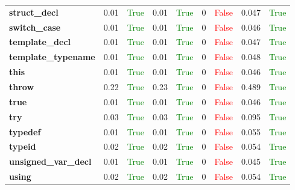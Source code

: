 \documentclass{article}
\begin{document}
\begin{xltabular}{\textwidth}{lcccccccc}
\textbf{{\fontsize{10}{12}\selectfont struct\_decl}}& 0.01&\textcolor{green}{True}& 0.01&\textcolor{green}{True}& 0&\textcolor{red}{False}& 0.047&\textcolor{green}{True} \\[0.5ex]
\textbf{{\fontsize{10}{12}\selectfont switch\_case}}& 0.01&\textcolor{green}{True}& 0.01&\textcolor{green}{True}& 0&\textcolor{red}{False}& 0.046&\textcolor{green}{True} \\[0.5ex]
\textbf{{\fontsize{10}{12}\selectfont template\_decl}}& 0.01&\textcolor{green}{True}& 0.01&\textcolor{green}{True}& 0&\textcolor{red}{False}& 0.047&\textcolor{green}{True} \\[0.5ex]
\textbf{{\fontsize{10}{12}\selectfont template\_typename}}& 0.01&\textcolor{green}{True}& 0.01&\textcolor{green}{True}& 0&\textcolor{red}{False}& 0.048&\textcolor{green}{True} \\[0.5ex]
\textbf{{\fontsize{10}{12}\selectfont this}}& 0.01&\textcolor{green}{True}& 0.01&\textcolor{green}{True}& 0&\textcolor{red}{False}& 0.046&\textcolor{green}{True} \\[0.5ex]
\textbf{{\fontsize{10}{12}\selectfont throw}}& 0.22&\textcolor{green}{True}& 0.23&\textcolor{green}{True}& 0&\textcolor{red}{False}& 0.489&\textcolor{green}{True} \\[0.5ex]
\textbf{{\fontsize{10}{12}\selectfont true}}& 0.01&\textcolor{green}{True}& 0.01&\textcolor{green}{True}& 0&\textcolor{red}{False}& 0.046&\textcolor{green}{True} \\[0.5ex]
\textbf{{\fontsize{10}{12}\selectfont try}}& 0.03&\textcolor{green}{True}& 0.03&\textcolor{green}{True}& 0&\textcolor{red}{False}& 0.095&\textcolor{green}{True} \\[0.5ex]
\textbf{{\fontsize{10}{12}\selectfont typedef}}& 0.01&\textcolor{green}{True}& 0.01&\textcolor{green}{True}& 0&\textcolor{red}{False}& 0.055&\textcolor{green}{True} \\[0.5ex]
\textbf{{\fontsize{10}{12}\selectfont typeid}}& 0.02&\textcolor{green}{True}& 0.02&\textcolor{green}{True}& 0&\textcolor{red}{False}& 0.054&\textcolor{green}{True} \\[0.5ex]
\textbf{{\fontsize{10}{12}\selectfont unsigned\_var\_decl}}& 0.01&\textcolor{green}{True}& 0.01&\textcolor{green}{True}& 0&\textcolor{red}{False}& 0.045&\textcolor{green}{True} \\[0.5ex]
\textbf{{\fontsize{10}{12}\selectfont using}}& 0.02&\textcolor{green}{True}& 0.02&\textcolor{green}{True}& 0&\textcolor{red}{False}& 0.054&\textcolor{green}{True} \\[0.5ex]

\end{xltabular}
\end{document}
